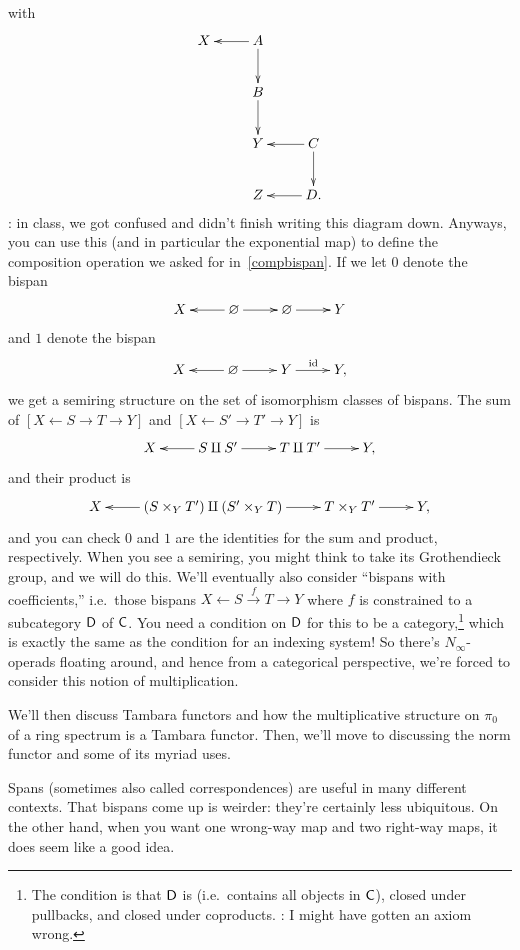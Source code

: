 with
\[\xymatrix{
	X & A\ar[l]\ar[d]\\
	& B\ar[d]\\
	& Y & C\ar[l]\ar[d]\\
	& Z & D.\ar[l]
}\]
\TODO: in class, we got confused and didn't finish writing this diagram down. Anyways, you can use this (and in
particular the exponential map) to define the composition operation we asked for in~\eqref{compbispan}.
If we let $0$ denote the bispan
\[\xymatrix{
	X & \emptyset\ar[l]\ar[r] & \emptyset\ar[r] & Y
}\]
and $1$ denote the bispan
\[\xymatrix{
	X & \emptyset\ar[l]\ar[r] & Y\ar[r]^\id & Y,
}\]
we get a semiring structure on the set of isomorphism classes of bispans. The sum of $[X\gets S\to T\to Y]$ and
$[X\gets S'\to T'\to Y]$ is
\[\xymatrix{
	X & S\amalg S'\ar[l]\ar[r] & T\amalg T'\ar[r] & Y,
}\]
and their product is
\[\xymatrix{
	X & (S\times_Y T') \amalg (S'\times_Y T)\ar[l]\ar[r] & T\times_Y T'\ar[r] & Y,
}\]
and you can check $0$ and $1$ are the identities for the sum and product, respectively. When you see a semiring,
you might think to take its Grothendieck group, and we will do this. We'll eventually also consider ``bispans with
coefficients,'' i.e.\ those bispans $X\gets S\stackrel f\to T\to Y$ where $f$ is constrained to a subcategory $\mathsf D$
of $\mathsf C$. You need a condition on $\mathsf D$ for this to be a category,\footnote{The condition is that $\mathsf D$ is
 (i.e.\ contains all objects in $\mathsf C$), closed under pullbacks, and closed under coproducts. \TODO: I
might have gotten an axiom wrong.} which is exactly the same as the condition for an indexing system! So there's
$N_\infty$-operads floating around, and hence from a categorical perspective, we're forced to consider this notion
of multiplication.

We'll then discuss Tambara functors and how the multiplicative structure on $\pi_0$ of a ring spectrum is a Tambara
functor. Then, we'll move to discussing the norm functor and some of its myriad uses.
\begin{rem}
Spans (sometimes also called correspondences) are useful in many different contexts. That bispans come up is
weirder: they're certainly less ubiquitous. On the other hand, when you want one wrong-way map and two right-way
maps, it does seem like a good idea.
\end{rem}
